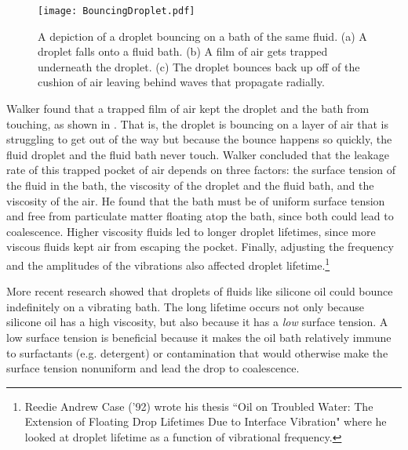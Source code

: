 \begin{figure}[h!]
	\centering
	\texttt{[image: BouncingDroplet.pdf]}
	\caption{A depiction of a droplet bouncing on a bath of the same fluid. (a) A droplet falls onto a fluid bath. (b) A film of air gets trapped underneath the droplet. (c) The droplet bounces back up off of the cushion of air leaving behind waves that propagate radially.}
	\label{bounce}
\end{figure}
	    
	    Walker found that a trapped film of air kept the droplet and the bath from touching, as shown in . That is, the droplet is bouncing on a layer of air that is struggling to get out of the way but because the bounce happens so quickly, the fluid droplet and the fluid bath never touch. Walker concluded that the leakage rate of this trapped pocket of air depends on three factors: the surface tension of the fluid in the bath, the viscosity of the droplet and the fluid bath, and the viscosity of the air. He found that the bath must be of uniform surface tension and free from particulate matter floating atop the bath, since both could lead to coalescence. Higher viscosity fluids led to longer droplet lifetimes, since more viscous fluids kept air from escaping the pocket. Finally, adjusting the frequency and the amplitudes of the vibrations also affected droplet lifetime.\footnote{Reedie Andrew Case ('92) wrote his thesis ``Oil on Troubled Water: The Extension of Floating Drop Lifetimes Due to Interface Vibration" where he looked at droplet lifetime as a function of vibrational frequency.}   
	     
	    More recent research showed that droplets of fluids like silicone oil could bounce indefinitely on a vibrating bath. The long lifetime occurs not only because silicone oil has a high viscosity, but also because it has a \textit{low} surface tension. A low surface tension is beneficial because it makes the oil bath relatively immune to surfactants (e.g. detergent) or contamination that would otherwise make the surface tension nonuniform and lead the drop to coalescence. 

